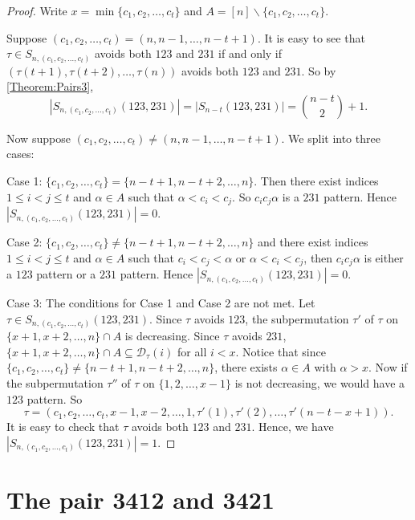 \documentclass[11pt]{article}
\theoremstyle{definition}
\numberwithin{equation}{section}
\begin{document}
\begin{proof}
Write $x=\min\{c_1,c_2,\ldots,c_t\}$ and $A=[n]\backslash\{c_1,c_2,\ldots,c_t\}$.

    Suppose $(c_1,c_2,\ldots,c_t)=(n,n-1,\ldots,n-t+1)$. It is easy to see that $\tau\in S_{n,(c_1,c_2,\ldots,c_t)}$ avoids both $123$ and $231$ if and only if $(\tau(t+1),\tau(t+2),\ldots,\tau(n))$ avoids both $123$ and $231$. So by \cref{Theorem:Pairs3},
\[
|S_{n,(c_1,c_2,\ldots,c_t)}(123,231)|=|S_{n-t}(123,231)|=\binom{n-t}{2}+1.
\]

Now suppose $(c_1,c_2,\ldots,c_t)\neq (n,n-1,\ldots,n-t+1)$. We split into three cases:

Case 1: $\{c_1,c_2,\ldots,c_t\}=\{n-t+1,n-t+2,\ldots,n\}$. Then there exist indices $1\leq i<j\leq t$ and $\alpha\in A$ such that $\alpha<c_i<c_j$. So $c_ic_j\alpha$ is a $231$ pattern. Hence $|S_{n,(c_1,c_2,\ldots,c_t)}(123,231)|=0$.

Case 2: $\{c_1,c_2,\ldots,c_t\}\neq \{n-t+1,n-t+2,\ldots,n\}$ and there exist indices $1\leq i<j\leq t$ and $\alpha\in A$ such that $c_i<c_j<\alpha$ or $\alpha<c_i<c_j$, then $c_ic_j\alpha$ is either a $123$ pattern or a $231$ pattern. Hence $|S_{n,(c_1,c_2,\ldots,c_t)}(123,231)|=0$.

Case 3: The conditions for Case 1 and Case 2 are not met. Let $\tau\in S_{n,(c_1,c_2,\ldots,c_t)}(123,231)$. Since $\tau$ avoids $123$, the subpermutation $\tau'$ of $\tau$ on $\{x+1,x+2,\ldots,n\}\cap A$ is decreasing. Since $\tau$ avoids $231$, $\{x+1,x+2,\ldots,n\}\cap A\subseteq\mathcal{D}_\tau(i)$ for all $i<x$. Notice that since $\{c_1,c_2,\ldots,c_t\}\neq \{n-t+1,n-t+2,\ldots,n\}$, there exists $\alpha\in A$ with $\alpha>x$. Now if the subpermutation $\tau''$ of $\tau$ on $\{1,2,\ldots,x-1\}$ is not decreasing, we would have a $123$ pattern. So \[\tau=(c_1,c_2,\ldots,c_t,x-1,x-2,\ldots,1, \tau'(1),\tau'(2),\ldots,\tau'(n-t-x+1)).\] It is easy to check that $\tau$ avoids both $123$ and $231$. Hence, we have $|S_{n,(c_1,c_2,\ldots,c_t)}(123,231)|=1$.
\end{proof}






\section{The pair 3412 and 3421}\label{Section:Pair4}
\end{document}
